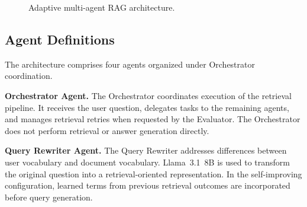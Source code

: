 \documentclass[acmsmall,review,anonymous,screen]{acmart}
\begin{document}
\begin{figure}[h]
{%
}
\caption{Adaptive multi-agent RAG architecture.}
\label{fig:architecture}
\end{figure}

\subsection{Agent Definitions}\label{sec:agents}

The architecture comprises four agents organized under Orchestrator
coordination.

\textbf{Orchestrator Agent.}
The Orchestrator coordinates execution of the retrieval pipeline. It
receives the user question, delegates tasks to the remaining agents, and
manages retrieval retries when requested by the Evaluator. The
Orchestrator does not perform retrieval or answer generation directly.

\textbf{Query Rewriter Agent.}
The Query Rewriter addresses differences between user vocabulary and
document vocabulary. Llama~3.1~8B is used to transform the original
question into a retrieval-oriented representation. In the self-improving
configuration, learned terms from previous retrieval outcomes are
incorporated before query generation.
\end{document}
